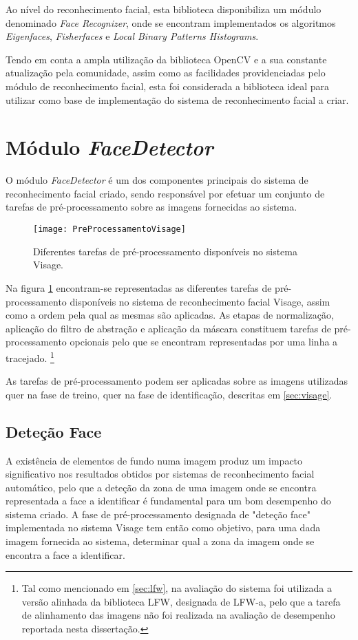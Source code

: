 Ao nível do reconhecimento facial, esta biblioteca disponibiliza um módulo denominado \textit{Face Recognizer}, onde se encontram implementados os algoritmos \textit{Eigenfaces}, \textit{Fisherfaces} e \textit{Local Binary Patterns Histograms}.

Tendo em conta a ampla utilização da biblioteca OpenCV e a sua constante atualização pela comunidade, assim como as facilidades providenciadas pelo módulo de reconhecimento facial, esta foi considerada a biblioteca ideal para utilizar como base de implementação do sistema de reconhecimento facial a criar. 


\section{Módulo \textit{FaceDetector}} \label{sec:facedetector}
O módulo \textit{FaceDetector} é um dos componentes principais do sistema de reconhecimento facial criado, sendo responsável por efetuar um conjunto de tarefas de pré-processamento sobre as imagens fornecidas ao sistema.

\begin{figure}[t]
  \begin{center}
    \leavevmode
    \texttt{[image: PreProcessamentoVisage]}
    \caption{Diferentes tarefas de pré-processamento disponíveis no sistema Visage.}
    \label{fig:preprocessamento}
  \end{center}
\end{figure}


Na figura \ref{fig:preprocessamento} encontram-se representadas as diferentes tarefas de pré-processamento disponíveis no sistema de reconhecimento facial Visage, assim como a ordem pela qual as mesmas são aplicadas. As etapas de normalização, aplicação do filtro de abstração e aplicação da máscara constituem tarefas de pré-processamento opcionais pelo que se encontram representadas por uma linha a tracejado. \footnote{Tal como mencionado em \ref{sec:lfw}, na avaliação do sistema foi utilizada a versão alinhada da biblioteca LFW, designada de LFW-a, pelo que a tarefa de alinhamento das imagens não foi realizada na avaliação de desempenho reportada nesta dissertação.}

As tarefas de pré-processamento podem ser aplicadas sobre as imagens utilizadas quer na fase de treino, quer na fase de identificação, descritas em \ref{sec:visage}.

\subsection{Deteção Face}
A existência de elementos de fundo numa imagem produz um impacto significativo nos resultados obtidos por sistemas de reconhecimento facial automático, pelo que a deteção da zona de uma imagem onde se encontra representada a face a identificar é fundamental para um bom desempenho do sistema criado. A fase de pré-processamento designada de "deteção face" implementada no sistema Visage tem então como objetivo, para uma dada imagem fornecida ao sistema, determinar qual a zona da imagem onde se encontra a face a identificar.

